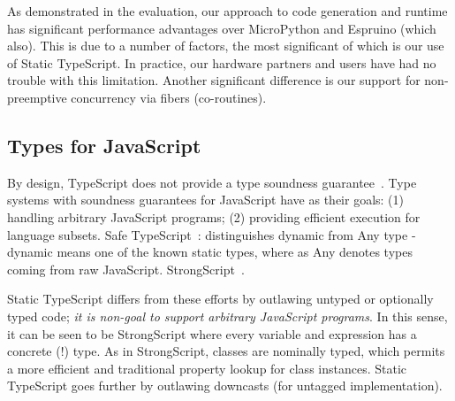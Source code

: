 As demonstrated in the evaluation, our approach to code generation and runtime
has significant performance advantages over MicroPython and Espruino (which also).
This is due to a number of factors, the most significant of which is our use of
Static TypeScript. In practice, our hardware partners and users have had no
trouble with this limitation.  Another significant difference is our support
for non-preemptive concurrency via fibers (co-routines). 











\subsection{Types for JavaScript}

By design, TypeScript does not provide a type soundness guarantee~\cite{BiermanAT14}.
Type systems with soundness guarantees for JavaScript have as their
goals: (1) handling arbitrary JavaScript programs; (2) providing efficient
execution for language subsets.
Safe TypeScript~\cite{SafeTypeScript15}: distinguishes dynamic from Any type - dynamic means
one of the known static types, where as Any denotes types coming
from raw JavaScript.
StrongScript~\cite{StrongScriptECOOP15}.

Static TypeScript differs from these efforts by outlawing untyped or optionally typed
code; \emph{it is non-goal to support arbitrary JavaScript programs}.
In this sense, it can be seen to be StrongScript where every variable and 
expression has a concrete (!) type.   As in StrongScript, classes are nominally typed,
which permits a more efficient and traditional property lookup for class instances. 
Static TypeScript goes further by outlawing downcasts (for untagged implementation).

